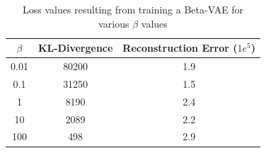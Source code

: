 \begin{table}[!ht]
    \centering
    \caption{Loss values resulting from training a Beta-VAE for various $\beta$ values}
    \label{tab:beta-vae-loss-values}
    \begin{tabular}{ccc}
        \hline
        $\beta$ & KL-Divergence & Reconstruction Error ($1e^5$) \\
        \hline
        0.01    & 80200         & 1.9                           \\
        0.1     & 31250         & 1.5                           \\
        1       & 8190          & 2.4                           \\
        10      & 2089          & 2.2                           \\
        100     & 498           & 2.9                           \\
        \hline
    \end{tabular}
\end{table}

